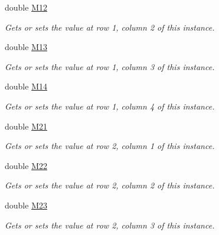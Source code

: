 \begin{DoxyCompactItemize}
double \hyperlink{struct_open_t_k_1_1_matrix2x4d_a1741aebdbf36dd902d6b716844130980}{M12}
\begin{DoxyCompactList}\small\item\em Gets or sets the value at row 1, column 2 of this instance. \end{DoxyCompactList}\item 
double \hyperlink{struct_open_t_k_1_1_matrix2x4d_af845de5431e5c09062113b273448fe92}{M13}
\begin{DoxyCompactList}\small\item\em Gets or sets the value at row 1, column 3 of this instance. \end{DoxyCompactList}\item 
double \hyperlink{struct_open_t_k_1_1_matrix2x4d_a2faa3e91dfd4ec4f58cb8d6941b12622}{M14}
\begin{DoxyCompactList}\small\item\em Gets or sets the value at row 1, column 4 of this instance. \end{DoxyCompactList}\item 
double \hyperlink{struct_open_t_k_1_1_matrix2x4d_aacd1ee880aa7955ef81828f7bf0948dc}{M21}
\begin{DoxyCompactList}\small\item\em Gets or sets the value at row 2, column 1 of this instance. \end{DoxyCompactList}\item 
double \hyperlink{struct_open_t_k_1_1_matrix2x4d_af2c85ac54d1d99635eff32e5e6d2322a}{M22}
\begin{DoxyCompactList}\small\item\em Gets or sets the value at row 2, column 2 of this instance. \end{DoxyCompactList}\item 
double \hyperlink{struct_open_t_k_1_1_matrix2x4d_ae5b70efcca57ecfb2c7da1f19aaad105}{M23}
\begin{DoxyCompactList}\small\item\em Gets or sets the value at row 2, column 3 of this instance. \end{DoxyCompactList}\item 

\end{DoxyCompactItemize}

